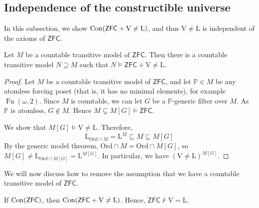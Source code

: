\subsection{Independence of the constructible universe}
In this subsection, we show \( \operatorname{Con}(\mathsf{ZFC} + \mathrm{V} \neq \mathrm{L}) \), and thus \( \mathrm{V} \neq \mathrm{L} \) is independent of the axioms of \( \mathsf{ZFC} \).
\begin{theorem}
    Let \( M \) be a countable transitive model of \( \mathsf{ZFC} \).
    Then there is a countable transitive model \( N \supseteq M \) such that \( N \vDash \mathsf{ZFC} + \mathrm{V} \neq \mathrm{L} \).
\end{theorem}
\begin{proof}
    Let \( M \) be a countable transitive model of \( \mathsf{ZFC} \), and let \( \mathbb P \in M \) be any atomless forcing poset (that is, it has no minimal elements), for example \( \operatorname{Fn}(\omega, 2) \).
    Since \( M \) is countable, we can let \( G \) be a \( \mathbb P \)-generic filter over \( M \).
    As \( \mathbb P \) is atomless, \( G \notin M \).
    Hence \( M \subsetneq M[G] \vDash \mathsf{ZFC} \).

    We show that \( M[G] \vDash \mathrm{V} \neq \mathrm{L} \).
    Therefore,
    \[ \mathrm{L}_{\mathrm{Ord} \cap M} = \mathrm{L}^M \subseteq M \subsetneq M[G] \]
    By the generic model theorem, \( \mathrm{Ord} \cap M = \mathrm{Ord} \cap M[G] \), so \( M[G] \neq \mathrm{L}_{\mathrm{Ord} \cap M[G]} = \mathrm{L}^{M[G]} \).
    In particular, we have \( (\mathrm{V} \neq \mathrm{L})^{M[G]} \).
\end{proof}
We will now discuss how to remove the assumption that we have a countable transitive model of \( \mathsf{ZFC} \).
\begin{theorem}
    If \( \operatorname{Con}(\mathsf{ZFC}) \), then \( \operatorname{Con}(\mathsf{ZFC} + \mathrm{V} \neq \mathrm{L}) \).
    Hence, \( \mathsf{ZFC} \nvdash \mathrm{V} = \mathrm{L} \).
\end{theorem}
